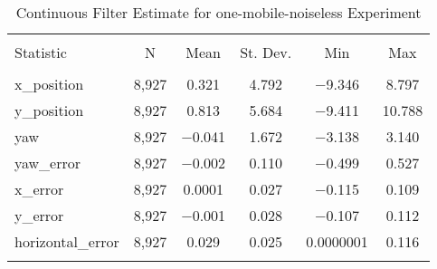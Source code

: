 
\begin{table}[h] \centering 
  \caption{Continuous Filter Estimate for one-mobile-noiseless Experiment} 
  \label{tab:one_mobile_noiseless_continuous_summary} 
\begin{tabular}{@{\extracolsep{5pt}}lccccc} 
\\[-1.8ex]\hline 
\hline \\[-1.8ex] 
Statistic & \multicolumn{1}{c}{N} & \multicolumn{1}{c}{Mean} & \multicolumn{1}{c}{St. Dev.} & \multicolumn{1}{c}{Min} & \multicolumn{1}{c}{Max} \\ 
\hline \\[-1.8ex] 
x\_position & 8,927 & 0.321 & 4.792 & $-$9.346 & 8.797 \\ 
y\_position & 8,927 & 0.813 & 5.684 & $-$9.411 & 10.788 \\ 
yaw & 8,927 & $-$0.041 & 1.672 & $-$3.138 & 3.140 \\ 
yaw\_error & 8,927 & $-$0.002 & 0.110 & $-$0.499 & 0.527 \\ 
x\_error & 8,927 & 0.0001 & 0.027 & $-$0.115 & 0.109 \\ 
y\_error & 8,927 & $-$0.001 & 0.028 & $-$0.107 & 0.112 \\ 
horizontal\_error & 8,927 & 0.029 & 0.025 & 0.0000001 & 0.116 \\ 
\hline \\[-1.8ex] 
\end{tabular} 
\end{table} 
